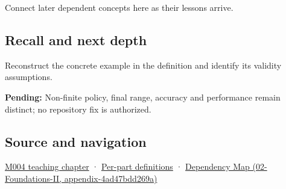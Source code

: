 Connect later dependent concepts here as their lessons arrive.

\subsection{Recall and next depth}\label{appendix-7f1e17dcafb1-recall-and-next-depth}

Reconstruct the concrete example in the definition and identify its validity assumptions.

\textbf{Pending:} Non-finite policy, final range, accuracy and performance remain distinct; no repository fix is authorized.

\subsection{Source and navigation}\label{appendix-7f1e17dcafb1-source-and-navigation}

\hyperref[01-foundations-i-ch001-a-stretching-ruler-for-real-valued-quantities]{M004 teaching chapter} · \hyperref[appendix-fd090d982a15-m004---parts-61-76]{Per-part definitions} · \href{../02-Foundations-II/main.pdf\#nameddest=appendix-4ad47bdd269a}{Dependency Map (02-Foundations-II, appendix-4ad47bdd269a)}
